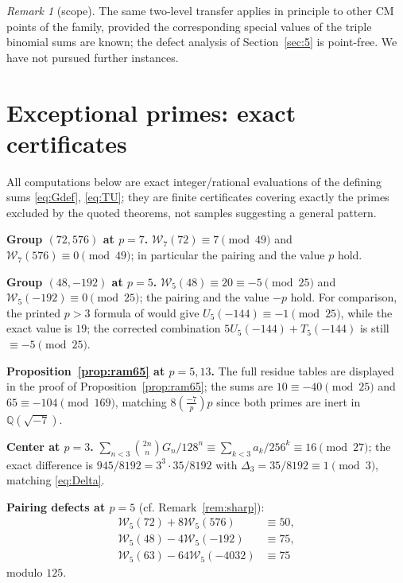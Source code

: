 \documentclass[11pt]{amsart}
\theoremstyle{definition}
\theoremstyle{remark}
\newtheorem{remark}[theorem]{Remark}
\newcommand{\Q}{\mathbb{Q}}
\newcommand{\leg}[2]{\left(\frac{#1}{#2}\right)}
\begin{document}
\begin{remark}[scope]
The same two-level transfer applies in principle to other CM points of
the family, provided the corresponding special values of the triple
binomial sums are known; the defect analysis of Section~\ref{sec:5} is
point-free. We have not pursued further instances.
\end{remark}

\appendix

\section{Exceptional primes: exact certificates}\label{app:A}

All computations below are exact integer/rational evaluations of the
defining sums \eqref{eq:Gdef}, \eqref{eq:TU}; they are finite
certificates covering exactly the primes excluded by the quoted
theorems, not samples suggesting a general pattern.

\medskip
\noindent\textbf{Group $(72,576)$ at $p=7$.}
$\mathcal W_7(72)\equiv7\pmod{49}$ and
$\mathcal W_7(576)\equiv0\pmod{49}$; in particular the pairing and the
value $p$ hold.

\noindent\textbf{Group $(48,-192)$ at $p=5$.}
$\mathcal W_5(48)\equiv20\equiv-5\pmod{25}$ and
$\mathcal W_5(-192)\equiv0\pmod{25}$; the pairing and the value $-p$
hold. For comparison, the printed $p>3$ formula of
\cite[Theorem~2.9]{SunBQF} would give $U_5(-144)\equiv-1\pmod{25}$,
while the exact value is $19$; the corrected combination
$5U_5(-144)+T_5(-144)$ is still $\equiv-5\pmod{25}$.

\noindent\textbf{Proposition~\ref{prop:ram65} at $p=5,13$.} The full
residue tables are displayed in the proof of
Proposition~\ref{prop:ram65}; the sums are $10\equiv-40\pmod{25}$ and
$65\equiv-104\pmod{169}$, matching $8\leg{-7}{p}p$ since both primes
are inert in $\Q(\sqrt{-7})$.

\noindent\textbf{Center at $p=3$.}
$\sum_{n<3}\binom{2n}{n}G_n/128^n\equiv\sum_{k<3}a_k/256^k\equiv16
\pmod{27}$; the exact difference is $945/8192=3^3\cdot35/8192$ with
$\Delta_3=35/8192\equiv1\pmod3$, matching \eqref{eq:Delta}.

\noindent\textbf{Pairing defects at $p=5$} (cf. Remark~\ref{rem:sharp}):
\begin{align*}
\mathcal W_5(72)+8\mathcal W_5(576)&\equiv50,\\
\mathcal W_5(48)-4\mathcal W_5(-192)&\equiv75,\\
\mathcal W_5(63)-64\mathcal W_5(-4032)&\equiv75
\end{align*}
modulo $125$.
\end{document}
